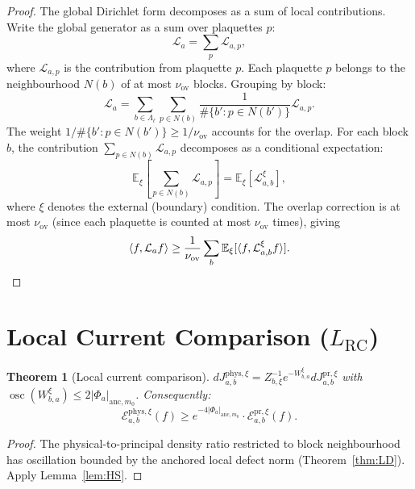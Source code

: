 \documentclass[12pt]{article}
\theoremstyle{plain}
\newtheorem{theorem}{Theorem}[section]
\theoremstyle{definition}
\numberwithin{equation}{section}
\newcommand{\osc}{\operatorname{osc}}
\newcommand{\pr}{\mathrm{pr}}
\newcommand{\phys}{\mathrm{phys}}
\newcommand{\ov}{\mathrm{ov}}
\begin{document}
\begin{proof}
The global Dirichlet form decomposes as a sum of local contributions.  Write the global generator as a sum over plaquettes $p$:
\begin{equation}
\mathcal{L}_a = \sum_p\mathcal{L}_{a,p},
\end{equation}
where $\mathcal{L}_{a,p}$ is the contribution from plaquette $p$.  Each plaquette $p$ belongs to the neighbourhood $N(b)$ of at most $\nu_{\ov}$ blocks.  Grouping by block:
\begin{equation}
\mathcal{L}_a = \sum_{b\in\Lambda_\ell}\sum_{p\in N(b)}\frac{1}{\#\{b':p\in N(b')\}}\mathcal{L}_{a,p}.
\end{equation}
The weight $1/\#\{b':p\in N(b')\}\geq 1/\nu_{\ov}$ accounts for the overlap.  For each block $b$, the contribution $\sum_{p\in N(b)}\mathcal{L}_{a,p}$ decomposes as a conditional expectation:
\begin{equation}
\mathbb{E}_\xi\left[\sum_{p\in N(b)}\mathcal{L}_{a,p}\right] = \mathbb{E}_\xi[\mathcal{L}_{a,b}^\xi],
\end{equation}
where $\xi$ denotes the external (boundary) condition.  The overlap correction is at most $\nu_{\ov}$ (since each plaquette is counted at most $\nu_{\ov}$ times), giving
\begin{equation}
\langle f,\mathcal{L}_a f\rangle \geq \frac{1}{\nu_{\ov}}\sum_b\mathbb{E}_\xi[\langle f,\mathcal{L}_{a,b}^\xi f\rangle].\qedhere
\end{equation}
\end{proof}


\section{Local Current Comparison ($L_{\mathrm{RC}}$)}\label{sec:LRC}

\begin{theorem}[Local current comparison]\label{thm:LRC}
$dJ_{a,b}^{\phys,\xi}=Z_{b,\xi}^{-1}e^{-W_{b,a}^\xi}dJ_{a,b}^{\pr,\xi}$ with $\osc(W_{b,a}^\xi)\leq 2|\Phi_a|_{\mathrm{anc},m_0}$.  Consequently:
\begin{equation}
\mathcal{E}_{a,b}^{\phys,\xi}(f) \geq e^{-4|\Phi_a|_{\mathrm{anc},m_0}}\cdot\mathcal{E}_{a,b}^{\pr,\xi}(f).
\end{equation}
\end{theorem}

\begin{proof}
The physical-to-principal density ratio restricted to block neighbourhood has oscillation bounded by the anchored local defect norm (Theorem~\ref{thm:LD}).  Apply Lemma~\ref{lem:HS}.
\end{proof}
\end{document}
